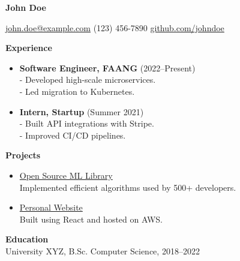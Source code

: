 \documentclass[a4paper,10pt]{article}
\begin{document}
\centerline{\huge \textbf{John Doe}}

\medskip

\noindent\href{mailto:john.doe@example.com}{john.doe@example.com} \quad (123) 456-7890 \quad \href{https://github.com/johndoe}{github.com/johndoe}

\medskip

\noindent\textbf{Experience}

\begin{itemize}[leftmargin=*]
    \item \textbf{Software Engineer, FAANG} (2022–Present) \\
    - Developed high-scale microservices. \\
    - Led migration to Kubernetes.

    \item \textbf{Intern, Startup} (Summer 2021) \\
    - Built API integrations with Stripe. \\
    - Improved CI/CD pipelines.
\end{itemize}

\medskip

\noindent\textbf{Projects}

\begin{itemize}[leftmargin=*]
    \item \href{https://github.com/johndoe/project1}{Open Source ML Library} \\
    Implemented efficient algorithms used by 500+ developers.
    
    \item \href{https://johndoe.dev}{Personal Website} \\
    Built using React and hosted on AWS.
\end{itemize}

\medskip

\noindent\textbf{Education} \\
University XYZ, B.Sc. Computer Science, 2018–2022
\end{document}
